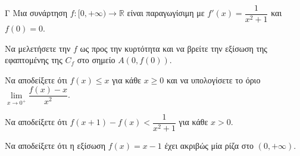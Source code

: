 \begin{thema}{Γ}
Μια συνάρτηση $f: [0, +\infty) \to \mathbb{R}$ είναι παραγωγίσιμη με $f'(x) = \dfrac{1}{x^2+1}$ και $f(0) = 0$.
\begin{erwthma}
  \item Να μελετήσετε την $f$ ως προς την κυρτότητα και να βρείτε την εξίσωση της εφαπτομένης της $C_f$ στο σημείο $A(0, f(0))$.
  \item Να αποδείξετε ότι $f(x) \le x$ για κάθε $x \ge 0$ και να υπολογίσετε το όριο $\lim\limits_{x \to 0^+} \dfrac{f(x) - x}{x^2}$.
  \item Να αποδείξετε ότι $f(x+1) - f(x) < \dfrac{1}{x^2+1}$ για κάθε $x > 0$.
  \item Να αποδείξετε ότι η εξίσωση $f(x) = x - 1$ έχει ακριβώς μία ρίζα στο $(0, +\infty)$.
\end{erwthma}
\end{thema}
